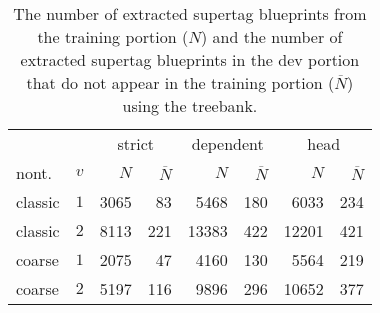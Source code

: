 \documentclass[../../document.tex]{subfiles}
\begin{document}
    \subsection{}
    \begin{table}
        \caption{\label{tbl:experiments:tiger:size}
        The number of extracted supertag blueprints from the training portion ($N$) and the number of extracted supertag blueprints in the dev portion that do not appear in the training portion ($\overline{N}$) using the \tiger{} treebank.
        }
        \centering
        \setlength{\tabcolsep}{4pt}
        \vspace{.2cm}
        \begin{tabular}{lc|rr|rr|rr}
            \toprule
            &        & \multicolumn{2}{c|}{strict} & \multicolumn{2}{c|}{dependent} & \multicolumn{2}{c}{head}  \\
  nont.   &\(v\)   & $N$ & $\overline{N}$ & $N$ & $\overline{N}$ & $N$ & $\overline{N}$ \\ \hline
   classic & \(1\)  & 3065 &  83 &  5468 & 180 &  6033 & 234  \\
   classic & \(2\)  & 8113 & 221 & 13383 & 422 & 12201 & 421   \\
   coarse  & \(1\)  & 2075 &  47 &  4160 & 130 &  5564 & 219      \\
   coarse  & \(2\)  & 5197 & 116 &  9896 & 296 & 10652 & 377  \\
    \bottomrule
        \end{tabular}
    \end{table}
\end{document}
